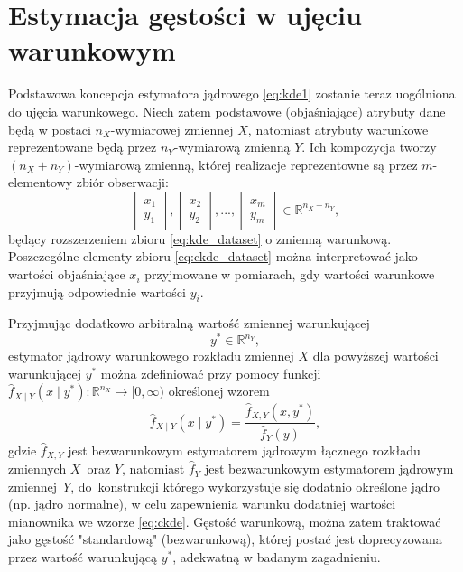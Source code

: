 \section{Estymacja gęstości w ujęciu warunkowym} \label{sec:ckde}
Podstawowa koncepcja estymatora jądrowego \eqref{eq:kde1} zostanie teraz uogólniona do ujęcia warunkowego. Niech zatem podstawowe (objaśniające) atrybuty dane będą w postaci $n_X$-wymiarowej zmiennej $X$, natomiast atrybuty warunkowe reprezentowane będą przez $n_Y$-wymiarową zmienną $Y$. Ich kompozycja tworzy $(n_X+n_Y)$-wymiarową zmienną, której realizacje reprezentowne są przez $m$-elementowy zbiór obserwacji:
\begin{equation}\label{eq:ckde_dataset}
\begin{bmatrix}
x_1 \\
y_1
\end{bmatrix},
\begin{bmatrix}
x_2 \\
y_2
\end{bmatrix},
...,
\begin{bmatrix}
x_m \\
y_m
\end{bmatrix} \in \mathbb{R}^{n_X+n_Y},
\end{equation}
będący rozszerzeniem zbioru \eqref{eq:kde_dataset} o zmienną warunkową. Poszczególne elementy zbioru \eqref{eq:ckde_dataset} można interpretować jako wartości objaśniające $x_i$ przyjmowane w pomiarach, gdy wartości warunkowe przyjmują odpowiednie wartości $y_i$.

Przyjmując dodatkowo arbitralną wartość zmiennej warunkującej
\begin{equation}
y^* \in \mathbb{R}^{n_Y},
\end{equation}
estymator jądrowy warunkowego rozkładu zmiennej $X$ dla powyższej wartości warunkującej $y^*$ można zdefiniować przy pomocy funkcji $\hat{f}_{X \mid Y}(x \mid y^*):\mathbb{R}^{n_X} \rightarrow [0,\infty)$ określonej wzorem
\begin{equation} \label{eq:ckde}
\hat{f}_{X \mid Y}(x \mid y^*) = \frac{\hat{f}_{X,Y}(x,y^*)}{\hat{f}_Y(y)},
\end{equation}
gdzie $\hat{f}_{X,Y}$ jest bezwarunkowym estymatorem jądrowym łącznego rozkładu zmiennych $X$~oraz $Y$, natomiast $\hat{f}_Y$ jest bezwarunkowym estymatorem jądrowym zmiennej~$Y$, do~konstrukcji którego wykorzystuje się dodatnio określone jądro (np. jądro normalne), w celu zapewnienia warunku dodatniej wartości mianownika we wzorze \eqref{eq:ckde}. Gęstość warunkową, można zatem traktować jako gęstość "standardową" (bezwarunkową), której postać jest doprecyzowana przez wartość warunkującą $y^*$, adekwatną w badanym zagadnieniu.

